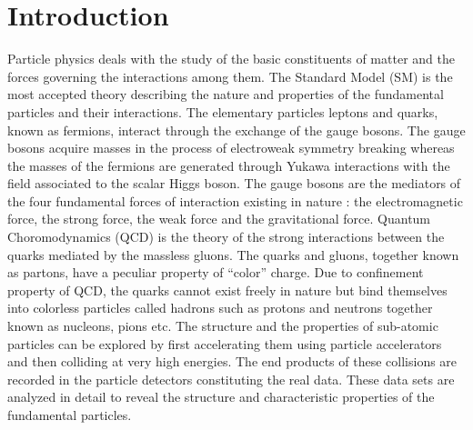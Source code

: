 \chapter{Introduction}
\label{chap:Introduction}

Particle physics deals with the study of the basic constituents of matter and the forces governing the interactions among them. The Standard Model (SM) is the most accepted theory describing the nature and properties of the fundamental particles and their interactions. The elementary particles leptons and quarks, known as fermions, interact through the exchange of the gauge bosons. The gauge bosons acquire masses in the process of electroweak symmetry breaking whereas the masses of the fermions are generated through Yukawa interactions with the field associated to the scalar Higgs boson. The gauge bosons are the mediators of the four fundamental forces of interaction existing in nature : the electromagnetic force, the strong force, the weak force and the gravitational force. Quantum Choromodynamics (QCD) is the theory of the strong interactions between the quarks mediated by the massless gluons. The quarks and gluons, together known as partons, have a peculiar property of ``color'' charge. Due to confinement property of QCD, the quarks cannot exist freely in nature but bind themselves into colorless particles called hadrons such as protons and neutrons together known as nucleons, pions etc. The structure and the properties of sub-atomic particles can be explored by first accelerating them using particle accelerators and then colliding at very high energies. The end products of these collisions are recorded in the particle detectors constituting the real data. These data sets are analyzed in detail to reveal the structure and characteristic properties of the fundamental particles.

